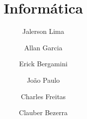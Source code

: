 \documentclass[12pt, a4paper]{book}
\begin{document}
\title{Informática}
\author{Jalerson Lima}
\author{Allan Garcia}
\author{Erick Bergamini}
\author{João Paulo}
\author{Charles Freitas}
\author{Clauber Bezerra}







\end{document}
